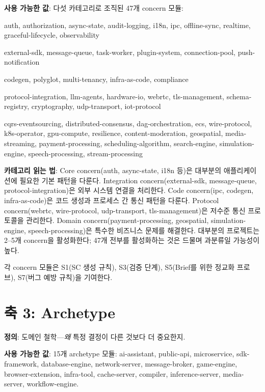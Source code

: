 \documentclass[11pt,a4paper,openright,twoside]{report}
\begin{document}
\textbf{사용 가능한 값}: 다섯 카테고리로 조직된 47개 concern 모듈:

\begin{description}[style=nextline]
  \item[Core] auth, authorization, async-state, audit-logging, i18n, ipc, offline-sync, realtime, graceful-lifecycle, observability
  \item[Integration] external-sdk, message-queue, task-worker, plugin-system, connection-pool, push-notification
  \item[Code] codegen, polyglot, multi-tenancy, infra-as-code, compliance
  \item[Protocol] protocol-integration, llm-agents, hardware-io, webrtc, tls-management, schema-registry, cryptography, udp-transport, iot-protocol
  \item[Domain] cqrs-eventsourcing, distributed-consensus, dag-orchestration, ecs, wire-protocol, k8s-operator, gpu-compute, resilience, content-moderation, geospatial, media-streaming, payment-processing, scheduling-algorithm, search-engine, simulation-engine, speech-processing, stream-processing
\end{description}

\textbf{카테고리 읽는 법}: Core concern(auth, async-state, i18n 등)은 대부분의 애플리케이션에 필요한 기본 패턴을 다룬다. Integration concern(external-sdk, message-queue, protocol-integration)은 외부 시스템 연결을 처리한다. Code concern(ipc, codegen, infra-as-code)은 코드 생성과 프로세스 간 통신 패턴을 다룬다. Protocol concern(webrtc, wire-protocol, udp-transport, tls-management)은 저수준 통신 프로토콜을 관리한다. Domain concern(payment-processing, geospatial, simulation-engine, speech-processing)은 특수한 비즈니스 문제를 해결한다. 대부분의 프로젝트는 2--5개 concern을 활성화한다; 47개 전부를 활성화하는 것은 드물며 과분류일 가능성이 높다.

각 concern 모듈은 S1(SC 생성 규칙), S3(검증 단계), S5(Brief를 위한 정교화 프로브), S7(버그 예방 규칙)을 기여한다.

\section{축 3: Archetype}

\textbf{정의}: 도메인 철학---\emph{왜} 특정 결정이 다른 것보다 더 중요한지.

\textbf{사용 가능한 값}: 15개 archetype 모듈: ai-assistant, public-api, microservice, sdk-framework, database-engine, network-server, message-broker, game-engine, browser-extension, infra-tool, cache-server, compiler, inference-server, media-server, workflow-engine.
\end{document}

